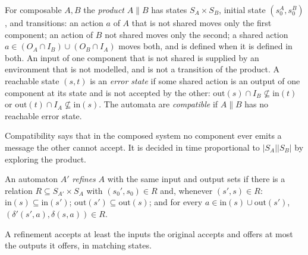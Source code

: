 \begin{definition}\label{def:compat}
For composable $A,B$ the \emph{product} $A\|B$ has states $S_A\times S_B$, initial state $(s_0^A,s_0^B)$, and transitions: an action $a$ of $A$ that is not shared moves only the first component; an action of $B$ not shared moves only the second; a shared action $a\in(O_A\cap I_B)\cup(O_B\cap I_A)$ moves both, and is defined when it is defined in both. An input of one component that is not shared is supplied by an environment that is not modelled, and is not a transition of the product. A reachable state $(s,t)$ is an \emph{error state} if some shared action is an output of one component at its state and is not accepted by the other: $\mathrm{out}(s)\cap I_B\not\subseteq\mathrm{in}(t)$ or $\mathrm{out}(t)\cap I_A\not\subseteq\mathrm{in}(s)$. The automata are \emph{compatible} if $A\|B$ has no reachable error state.
\end{definition}

Compatibility says that in the composed system no component ever emits a message the other cannot accept. It is decided in time proportional to $|S_A||S_B|$ by exploring the product.

\begin{definition}[Refinement]\label{def:refinement}
An automaton $A'$ \emph{refines} $A$ with the same input and output sets if there is a relation $R\subseteq S_{A'}\times S_A$ with $(s_0',s_0)\in R$ and, whenever $(s',s)\in R$: $\mathrm{in}(s)\subseteq\mathrm{in}(s')$; $\mathrm{out}(s')\subseteq\mathrm{out}(s)$; and for every $a\in\mathrm{in}(s)\cup\mathrm{out}(s')$, $(\delta'(s',a),\delta(s,a))\in R$.
\end{definition}

A refinement accepts at least the inputs the original accepts and offers at most the outputs it offers, in matching states.

